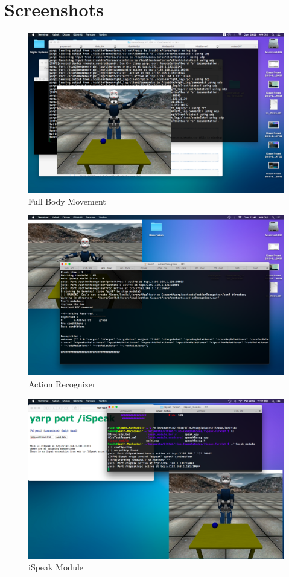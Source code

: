\documentclass[a4paper, 11pt]{report}
\begin{document}
\chapter{Screenshots}
\begin{figure}[h!]
  \centering
  \includegraphics[width=1.0\linewidth]{fullBody}
  \caption{Full Body Movement}
  \label{fig:fullBody}
\end{figure}
\begin{figure}[h!]
\centering
\includegraphics[width=1.0\linewidth]{actionRecognizer}
\caption{Action Recognizer}
\label{fig:actionRecognizer}
\end{figure}
\begin{figure}[h!]
\centering
\includegraphics[width=1.0\linewidth]{iSpeak}
\caption{iSpeak Module}
\label{fig:iSpeak}
\end{figure}
\end{document}
